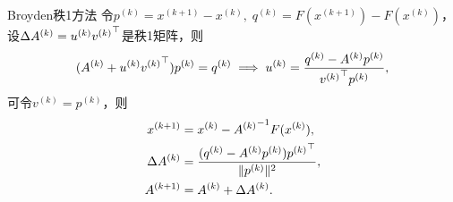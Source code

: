 \begin{theorem}
    {Broyden秩1方法}{}
    令$p^{(k)} = x^{(k+1)} - x^{(k)},\;q^{(k)} = F(x^{(k+1)}) - F(x^{(k)})$，设$\Delta A^{(k)} = u^{(k)}{v^{(k)}}^\top$是秩1矩阵，则
    \[
        (A^{(k)} + u^{(k)}{v^{(k)}}^\top)p^{(k)} = q^{(k)} \implies u^{(k)} = \frac{q^{(k)} - A^{(k)}p^{(k)}}{{v^{(k)}}^\top p^{(k)}},
    \]
    可令$v^{(k)} = p^{(k)}$，则
    \begin{subequations}
        \begin{align}
            x^{(k+1)} &= x^{(k)} - {A^{(k)}}^{-1} F(x^{(k)}),\\
            \Delta A^{(k)} &= \frac{(q^{(k)} - A^{(k)}p^{(k)}){p^{(k)}}^\top}{\lVert p^{(k)}\rVert^2},\\
            A^{(k+1)} &= A^{(k)} + \Delta A^{(k)}.
        \end{align}
    \end{subequations}
\end{theorem}
